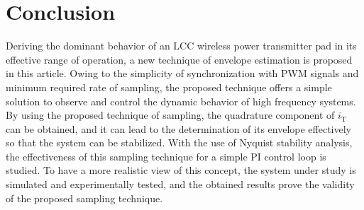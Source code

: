 \documentclass[journal,a4paper,10pt,twoside]{IEEEtran} %
\begin{document}
	\section{Conclusion}
	Deriving the dominant behavior of an LCC wireless power transmitter pad in its effective range of operation, a new technique of envelope estimation is proposed in this article. Owing to the simplicity of synchronization with PWM signals and minimum required rate of sampling, the proposed technique offers a simple solution to observe and control the dynamic behavior of high frequency systems. 
	By using the proposed technique of sampling, the quadrature component of $i_\mathrm{T}$ can be obtained, and it can lead to the determination of its envelope effectively so that the system can be stabilized.
	With the use of Nyquist stability analysis, the effectiveness of this sampling technique for a simple PI control loop is studied. To have a more realistic view of this concept, the system under study is simulated and experimentally tested, and the obtained results prove the validity of the proposed sampling technique.
	
\end{document}
